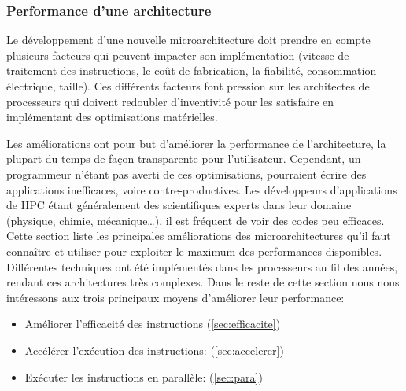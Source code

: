     \subsubsection{Performance d'une architecture}
    
    
        Le développement d'une nouvelle microarchitecture doit prendre en compte plusieurs facteurs qui peuvent impacter son implémentation (vitesse de traitement des instructions, le coût de fabrication, la fiabilité, consommation électrique, taille). Ces différents facteurs font pression sur les architectes de processeurs qui doivent redoubler d'inventivité pour les satisfaire en implémentant des optimisations matérielles.
        
        Les améliorations ont pour but d'améliorer la performance de l'architecture, la plupart du temps de façon transparente pour l'utilisateur. Cependant, un programmeur n'étant pas averti de ces optimisations, pourraient écrire des applications inefficaces, voire contre-productives. Les développeurs d'applications de \gls{HPC} étant généralement des scientifiques experts dans leur domaine (physique, chimie, mécanique…), il est fréquent de voir des codes peu efficaces. Cette section liste les principales améliorations des microarchitectures qu'il faut connaître et utiliser pour exploiter le maximum des performances disponibles. Différentes techniques ont été implémentés dans les processeurs au fil des années, rendant ces architectures très complexes. Dans le reste de cette section nous nous intéressons aux trois principaux moyens d'améliorer leur performance:
        \begin{itemize}
            \item Améliorer l'efficacité des instructions (\autoref{sec:efficacite}) 
            \item Accélérer l'exécution des instructions: (\autoref{sec:accelerer})
            \item Exécuter les instructions en parallèle: (\autoref{sec:para})
        \end{itemize}
        
        
